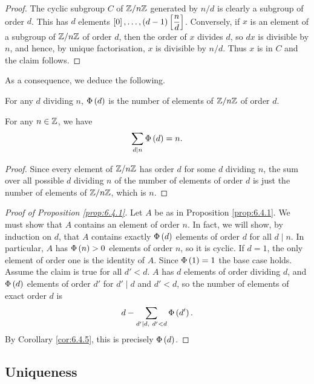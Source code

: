 \begin{proof}
The cyclic subgroup $ C $ of $ \mathbb{Z} / n\mathbb{Z} $ generated by $ n / d $ is clearly a subgroup of order $ d $. This has $ d $ elements $ \left[ 0 \right], \dots, \left( d - 1 \right)\left[ \dfrac{n}{d} \right] $. Conversely, if $ x $ is an element of a subgroup of $ \mathbb{Z} / n\mathbb{Z} $ of order $ d $, then the order of $ x $ divides $ d $, so $ dx $ is divisible by $ n $, and hence, by unique factorisation, $ x $ is divisible by $ n / d $. Thus $ x $ is in $ C $ and the claim follows.
\end{proof}

As a consequence, we deduce the following.

\begin{corollary}
For any $ d $ dividing $ n $, $ \Phi\left( d \right) $ is the number of elements of $ \mathbb{Z} / n\mathbb{Z} $ of order $ d $.
\end{corollary}

\begin{corollary}
\label{cor:6.4.5}
For any $ n \in \mathbb{Z} $, we have
$$ \sum_{d \mid n} \Phi\left( d \right) = n. $$
\end{corollary}

\begin{proof}
Since every element of $ \mathbb{Z} / n\mathbb{Z} $ has order $ d $ for some $ d $ dividing $ n $, the sum over all possible $ d $ dividing $ n $ of the number of elements of order $ d $ is just the number of elements of $ \mathbb{Z} / n\mathbb{Z} $, which is $ n $.
\end{proof}

\begin{proof}[Proof of Proposition \ref{prop:6.4.1}]
Let $ A $ be as in Proposition \ref{prop:6.4.1}. We must show that $ A $ contains an element of order $ n $. In fact, we will show, by induction on $ d $, that $ A $ contains exactly $ \Phi\left( d \right) $ elements of order $ d $ for all $ d \mid n $. In particular, $ A $ has $ \Phi\left( n \right) > 0 $ elements of order $ n $, so it is cyclic. If $ d = 1 $, the only element of order one is the identity of $ A $. Since $ \Phi\left( 1 \right) = 1 $ the base case holds. Assume the claim is true for all $ d' < d $. $ A $ has $ d $ elements of order dividing $ d $, and $ \Phi\left( d \right) $ elements of order $ d' $ for $ d' \mid d $ and $ d' < d $, so the number of elements of exact order $ d $ is
$$ d - \sum_{d' \mid d, \ d' < d} \Phi\left( d' \right). $$
By Corollary \ref{cor:6.4.5}, this is precisely $ \Phi\left( d \right) $.
\end{proof}

\pagebreak

\subsection{Uniqueness}

